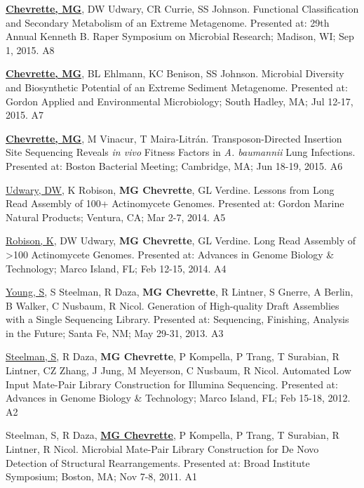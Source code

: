 \begin{cvpubs}
  \cvpub
    {\textbf{\underline{Chevrette, MG}}, DW Udwary, CR Currie, SS Johnson.  Functional Classification and Secondary Metabolism of an Extreme Metagenome.  Presented at: 29th Annual Kenneth B. Raper Symposium on Microbial Research; Madison, WI; Sep 1, 2015.} %
    {A8} %
    
  \cvpub
    {\textbf{\underline{Chevrette, MG}}, BL Ehlmann, KC Benison, SS Johnson.  Microbial Diversity and Biosynthetic Potential of an Extreme Sediment Metagenome.  Presented at: Gordon Applied and Environmental Microbiology; South Hadley, MA; Jul 12-17, 2015.} %
    {A7} %
    
  \cvpub
    {\textbf{\underline{Chevrette, MG}}, M Vinacur, T Maira-Litr\'{a}n.  Transposon-Directed Insertion Site Sequencing Reveals \textit{in vivo} Fitness Factors in \textit{A. baumannii} Lung Infections.  Presented at: Boston Bacterial Meeting; Cambridge, MA; Jun 18-19, 2015.} %
    {A6} %
    
  \cvpub
    {\underline{Udwary, DW}, K Robison, \textbf{MG Chevrette}, GL Verdine.  Lessons from Long Read Assembly of 100+ Actinomycete Genomes.  Presented at: Gordon Marine Natural Products; Ventura, CA; Mar 2-7, 2014.} %
    {A5} %
    
  \cvpub
    {\underline{Robison, K}, DW Udwary, \textbf{MG Chevrette}, GL Verdine.  Long Read Assembly of >100 Actinomycete Genomes.  Presented at: Advances in Genome Biology \& Technology; Marco Island, FL; Feb 12-15, 2014.} %
    {A4} %

  \cvpub
    {\underline{Young, S}, S Steelman, R Daza, \textbf{MG Chevrette}, R Lintner, S Gnerre, A Berlin, B Walker, C Nusbaum, R Nicol.  Generation of High-quality Draft Assemblies with a Single Sequencing Library.  Presented at: Sequencing, Finishing, Analysis in the Future; Santa Fe, NM; May 29-31, 2013.} %
    {A3} %
    
  \cvpub
    {\underline{Steelman, S}, R Daza, \textbf{MG Chevrette}, P Kompella, P Trang, T Surabian, R Lintner, CZ Zhang, J Jung, M Meyerson, C Nusbaum, R Nicol.  Automated Low Input Mate-Pair Library Construction for Illumina Sequencing.  Presented at: Advances in Genome Biology \& Technology; Marco Island, FL; Feb 15-18, 2012.} %
    {A2} %
    
  \cvpub
    {Steelman, S, R Daza, \underline{\textbf{MG Chevrette}}, P Kompella, P Trang, T Surabian, R Lintner, R Nicol.  Microbial Mate-Pair Library Construction for De Novo Detection of Structural Rearrangements.  Presented at: Broad Institute Symposium; Boston, MA; Nov 7-8, 2011.} %
    {A1} %

\end{cvpubs}